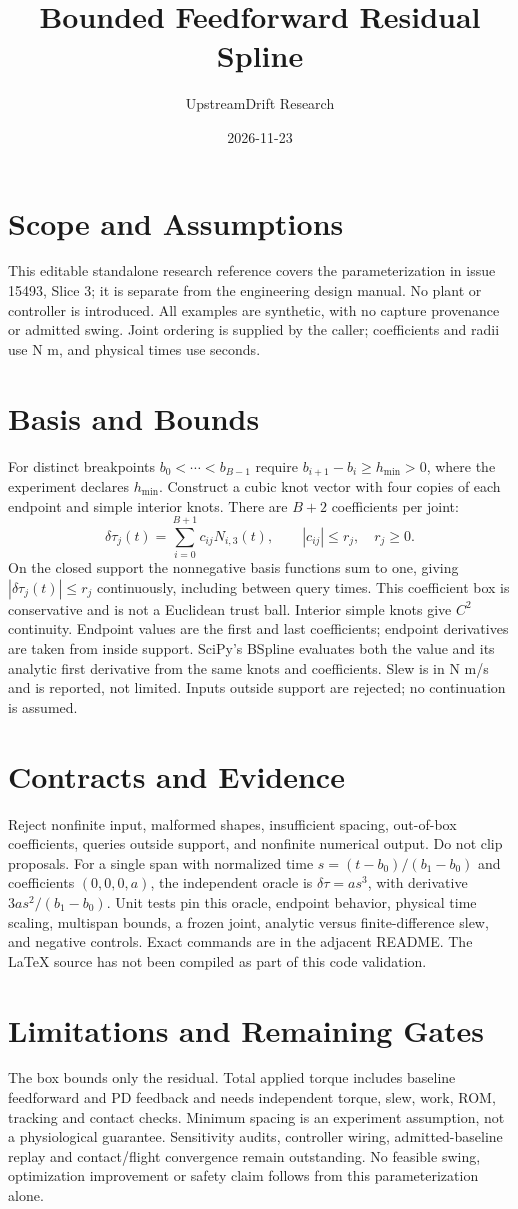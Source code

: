 \documentclass{article}
\title{Bounded Feedforward Residual Spline}
\author{UpstreamDrift Research}
\date{2026-11-23}
\begin{document}
\maketitle
\section{Scope and Assumptions}
This editable standalone research reference covers the parameterization in
issue 15493, Slice 3; it is separate from the engineering design manual.
No plant or controller is introduced. All examples are synthetic, with no
capture provenance or admitted swing. Joint ordering is supplied by the caller;
coefficients and radii use N m, and physical times use seconds.
\section{Basis and Bounds}
For distinct breakpoints $b_0<\cdots<b_{B-1}$ require
$b_{i+1}-b_i\geq h_{\min}>0$, where the experiment declares $h_{\min}$.
Construct a cubic knot vector with four copies of each endpoint and simple
interior knots. There are $B+2$ coefficients per joint:
\[
 \delta\tau_j(t)=\sum_{i=0}^{B+1}c_{ij}N_{i,3}(t),\qquad
 |c_{ij}|\leq r_j,\quad r_j\geq0.
\]
On the closed support the nonnegative basis functions sum to one, giving
$|\delta\tau_j(t)|\leq r_j$ continuously, including between query times.
This coefficient box is conservative and is not a Euclidean trust ball.
Interior simple knots give $C^2$ continuity. Endpoint values are the first
and last coefficients; endpoint derivatives are taken from inside support.
SciPy's BSpline evaluates both the value and its analytic first derivative
from the same knots and coefficients. Slew is in N m/s and is reported,
not limited. Inputs outside support are rejected; no continuation is assumed.
\section{Contracts and Evidence}
Reject nonfinite input, malformed shapes, insufficient spacing, out-of-box
coefficients, queries outside support, and nonfinite numerical output.
Do not clip proposals. For a single span with normalized time
$s=(t-b_0)/(b_1-b_0)$ and coefficients $(0,0,0,a)$, the independent oracle is
$\delta\tau=a s^3$, with derivative $3a s^2/(b_1-b_0)$.
Unit tests pin this oracle, endpoint behavior, physical time scaling,
multispan bounds, a frozen joint, analytic versus finite-difference slew,
and negative controls. Exact commands are in the adjacent README.
The LaTeX source has not been compiled as part of this code validation.
\section{Limitations and Remaining Gates}
The box bounds only the residual. Total applied torque includes baseline
feedforward and PD feedback and needs independent torque, slew, work, ROM,
tracking and contact checks. Minimum spacing is an experiment assumption,
not a physiological guarantee. Sensitivity audits, controller wiring,
admitted-baseline replay and contact/flight convergence remain outstanding.
No feasible swing, optimization improvement or safety claim follows from
this parameterization alone.
\end{document}

